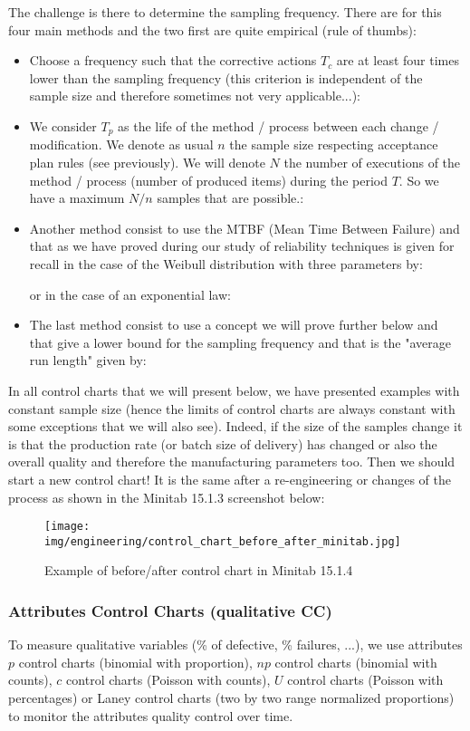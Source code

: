 	The challenge is there to determine the sampling frequency. There are for this four main methods and the two first are quite empirical (rule of thumbs):
	\begin{itemize}
		\item Choose a frequency such that the corrective actions $T_c$ are at least four times lower than the sampling frequency (this criterion is independent of the sample size and therefore sometimes not very applicable...):
		
		
		\item We consider $T_p$ as the life of the method / process between each change / modification. We denote as usual $n$ the sample size respecting acceptance plan rules (see previously). We will denote $N$ the number of executions of the method / process (number of produced items) during the period $T$. So we have a maximum $N/n$ samples that are possible.:
		
		
		\item Another method consist to use the MTBF (Mean Time Between Failure) and that as we have proved during our study of reliability techniques is given for recall in the case of the Weibull distribution with three parameters by:
		
		or in the case of an exponential law:
		
		
		\item The last method consist to use a concept we will prove further below and that give a lower bound for the sampling frequency and that is the "average run length" given by:
		
	\end{itemize}
	In all control charts that we will present below, we have presented examples with constant sample size (hence the limits of control charts are always constant with some exceptions that we will also see). Indeed, if the size of the samples change it is that the production rate (or batch size of delivery) has changed or also the overall quality and therefore the manufacturing parameters too. Then we should start a new control chart! It is the same after a re-engineering or changes of the process as shown in the Minitab 15.1.3 screenshot below:
	\begin{figure}[H]
		\centering
		\texttt{[image: img/engineering/control\_chart\_before\_after\_minitab.jpg]}
		\caption[]{Example of before/after control chart in Minitab 15.1.4}
	\end{figure}
	
	\subsubsection{Attributes Control Charts (qualitative CC)}
	To measure qualitative variables (\% of defective, \% failures, ...), we use attributes $p$ control charts (binomial with proportion), $np$ control charts (binomial with counts), $c$ control charts (Poisson with counts), $U$ control charts (Poisson with percentages) or Laney control charts (two by two range normalized proportions) to monitor the attributes quality control over time.

